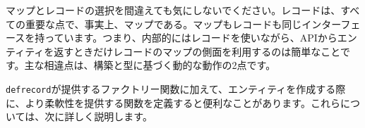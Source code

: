 マップとレコードの選択を間違えても気にしないでください。レコードは、すべての重要な点で、事実上、マップである。マップもレコードも同じインターフェースを持っています。つまり、内部的にはレコードを使いながら、APIからエンティティを返すときだけレコードのマップの側面を利用するのは簡単なことです。主な相違点は、構築と型に基づく動的な動作の2点です。

\texttt{defrecord}が提供するファクトリー関数に加えて、エンティティを作成する際に、より柔軟性を提供する関数を定義すると便利なことがあります。これらについては、次に詳しく説明します。 





